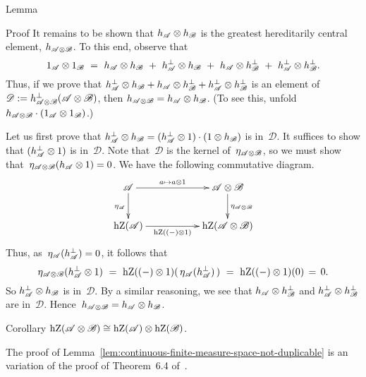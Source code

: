 \documentclass[a]{subfiles}
\begin{document}
\begin{parsec}
\begin{point}{Lemma}
\begin{point}{Proof}
It remains to be shown that
$h_{\mathscr{A}}\otimes h_\mathscr{B}$
is the greatest hereditarily central element,
$h_{\mathscr{A}\otimes \mathscr{B}}$.
To this end, observe that
\begin{equation*}
1_\scrA\otimes 1_\mathscr{B}
\ = \ 
h_\scrA\otimes h_\mathscr{B}
\ +\ 
h_\scrA^\perp\otimes h_\mathscr{B}
\ +\ 
h_\scrA\otimes h_\mathscr{B}^\perp
\ +\ 
h_\scrA^\perp\otimes h_\mathscr{B}^\perp.
\end{equation*}
Thus,
if we prove that
$h_{\mathscr{A}}^\perp\otimes h_\mathscr{B}
+ 
h_{\mathscr{A}}\otimes h_\mathscr{B}^\perp
+
h_{\mathscr{A}}^\perp\otimes h_\mathscr{B}^\perp$
is an element of~$\mathscr{D}:=
 h_{\mathscr{A}\otimes \mathscr{B}}^\perp
(\mathscr{A}\otimes\mathscr{B})$,
then $h_{\mathscr{A}\otimes \mathscr{B}}
= h_{\mathscr{A}}\otimes h_\mathscr{B}$.
(To see this, unfold $h_{\mathscr{A}\otimes \mathscr{B}}
\cdot (1_{\mathscr{A}}\otimes 1_\mathscr{B})$.)

Let us first prove that 
$h_{\mathscr{A}}^\perp \otimes h_\mathscr{B}
= (h_{\mathscr{A}}^\perp \otimes 1)\cdot(1\otimes h_\mathscr{B})$
is in~$\mathscr{D}$.
It suffices to show that 
$(h_{\mathscr{A}}^\perp \otimes 1)$
is in~$\mathscr{D}$.
Note that~$\mathscr{D}$ is the kernel 
of~$\eta_{\mathscr{A}\otimes\mathscr{B}}$,
so we must show that~$\eta_{\mathscr{A}\otimes\mathscr{B}}(h_{\mathscr{A}}
\otimes 1)=0$.
We have the following commutative diagram.
\begin{equation*}
\xymatrix{
\scrA
\ar[rr]^-{a\mapsto a\otimes 1}
\ar[d]_{\eta_\scrA}
&&
\scrA\otimes\mathscr{B}
\ar[d]^{\eta_{\scrA\otimes\mathscr{B}}}
\\
\hZ(\scrA)
\ar[rr]_-{\hZ((-)\otimes 1)}
&&
\hZ(\scrA\otimes \mathscr{B})
}
\end{equation*}
Thus,
as~$\eta_{\mathscr{A}}(h^\perp_{\mathscr{A}})=0$,
it follows that
\begin{equation*}
\eta_{\scrA\otimes \mathscr{B}}(h_\scrA^\perp
\otimes 1)
\ =\ 
\hZ((-)\otimes 1) (\, \eta_\scrA(h_\scrA^\perp)\,)
\ = \ 
\hZ((-)\otimes 1) (0)\,=\,0.
\end{equation*}
So
$h_{\mathscr{A}}^\perp \otimes h_\mathscr{B}$
is in~$\mathscr{D}$.
By a similar reasoning,
we see that 
$h_{\mathscr{A}} \otimes h^\perp_\mathscr{B}$
and
$h_{\mathscr{A}}^\perp \otimes h^\perp_\mathscr{B}$
are in~$\mathscr{D}$.
Hence~$h_{\mathscr{A}\otimes\mathscr{B}}
=h_{\mathscr{A}}\otimes h_\mathscr{B}$.
\end{point}
\end{point}
\begin{point}{Corollary}%
$\operatorname{hZ}(\mathscr{A}\otimes\mathscr{B})
\cong \operatorname{hZ}(\mathscr{A})\otimes\operatorname{hZ}(\mathscr{B})$.
\end{point}
\end{parsec}
The proof of 
Lemma~\ref{lem:continuous-finite-measure-space-not-duplicable} 
is an variation
of the proof of Theorem~6.4 of~\cite{Kornell2012}.
\end{document}

